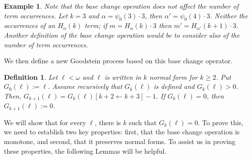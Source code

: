 \documentclass{amsart}
\theoremstyle{plain}
\theoremstyle{plain}
\newtheorem{example}[theorem]{Example}
\newtheorem*{definition}{Definition}
\newcommand{\kp}{[k\leftarrow k+1]}
\newcommand{\al}{{\alpha}}
\newcommand{\om}{\omega}
\begin{document}
\begin{example}
Note that the base change operation does not affect the number of term occurrences. Let $k=3$ and $\al = \psi_0(3) \cdot 3$, then $\al' = \psi_0(4) \cdot 3$. 
Neither the occurrences of an $H_\al(k)$ term; if $m=H_{\al}(k) \cdot 3$ then $m'=H_{\al'}(k+1)\cdot 3$.
Another definition of the base change operation would be to consider also of the number of term occurrences.\medskip
\end{example}
We then define a new Goodstein process based on this base change operator.

\begin{definition}
Let $\ell<\om$ and $\ell$ is written in $k$ normal form for $k\geq2$.
Put $G_0(\ell):=\ell.$
Assume recursively that $G_k(\ell)$ is defined and $G_k(\ell)>0$.
Then, $G_{k+1}(\ell)=G_k(\ell)[k+2 \leftarrow k+3] -1 $. If $G_k(\ell)=0$, then $G_{k+1}(\ell):=0$.
\end{definition}
\smallskip

We will show that for every $\ell$, there is $k$ such that $G_k(\ell) = 0$.
To prove this, we need to establish two key properties: first, that the base change operation is monotone, and second, that it preserves normal forms. 
To assist us in proving these properties, the following Lemmas will be helpful.
\medskip
\end{document}
